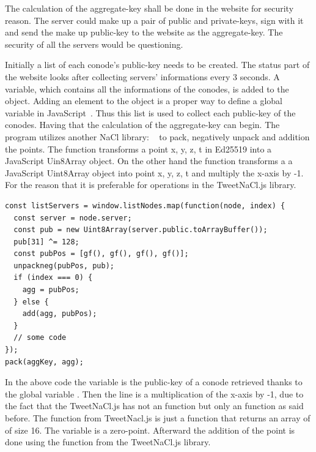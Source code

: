 \documentclass[11pt, a4paper, twoside, openright, openany]{article} %
\begin{document}
The calculation of the aggregate-key shall be done in the website for security reason.
The server could make up a pair of public and private-keys, sign with it and send
the make up public-key to the website as the aggregate-key. The security of all
the servers would be questioning.
\bigbreak

Initially a list of each conode's public-key needs to be created. The status part
of the website looks after collecting servers' informations every 3 seconds. A variable,
which contains all the informations of the conodes, is added to the  object.
Adding an element to the  object is a proper way to define a global variable
in JavaScript~\cite{globalVariable}. Thus this list is used to collect each public-key
of the conodes. Having that the calculation of the aggregate-key can begin.
The program utilizes another NaCl library: ~\cite{tweetNacl} to
pack, negatively unpack and addition the points. The function  transforms a point x, y, z, t in Ed25519
into a JavaScript Uin8Array object. On the other hand the function 
transforms a a JavaScript Uint8Array object into point x, y, z, t and multiply
the x-axis by -1. For the reason that it is preferable for operations in the TweetNaCl.js library.
\bigbreak

\begin{lstlisting}[caption={Extract of the code calculating the aggregate-key}, captionpos=b]
const listServers = window.listNodes.map(function(node, index) {
  const server = node.server;
  const pub = new Uint8Array(server.public.toArrayBuffer());
  pub[31] ^= 128;
  const pubPos = [gf(), gf(), gf(), gf()];
  unpackneg(pubPos, pub);
  if (index === 0) {
    agg = pubPos;
  } else {
    add(agg, pubPos);
  }
  // some code
});
pack(aggKey, agg);
\end{lstlisting}
\leavevmode \newline

In the above code the variable  is the public-key of a conode retrieved thanks to
the global variable .
\newline
Then the line  is
a multiplication of the x-axis by -1, due to the fact that the TweetNaCl.js has not
an  function but only an  function as said before.
\newline
The function  from TweetNacl.js is just a function that returns an array
of  of size 16. The variable  is a zero-point.
\newline
Afterward the addition of the point is done using the  function from
the TweetNaCl.js library.
\bigbreak
\end{document}

